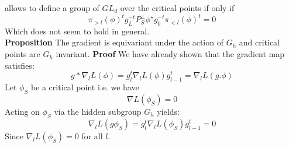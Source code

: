\documentclass{article}
\theoremstyle{definition}
\begin{document}
allows to define a group of $GL_d$ over the critical points if only if 
\begin{equation*}
   \pi_{>l}(\phi)^{t}g_L^{-t}P_S^{\perp}\phi^{\star}g_0^{-t}\pi_{<l}(\phi)^{t} = 0
\end{equation*}
Which does not seem to hold in general.
\\
\textbf{Proposition} The gradient is equivariant under the action of $G_h$ and critical points are $G_h$ invariant.
\textbf{Proof} We have already shown that the gradient map satisfies:
\begin{equation*}
    g \ast \nabla_l L(\phi) = g_l^t\nabla_l L(\phi) g_{l-1}^t = \nabla_l L(g.\phi)
\end{equation*}
Let $\phi_S$ be a critical point i.e. we have 
\begin{equation*}
    \nabla L(\phi_S) = 0
\end{equation*}
Acting on $\phi_S$ via the hidden subgroup $G_h$ yields:
\begin{equation*}
    \nabla_l L(g\phi_S) = g_l^t\nabla_l L(\phi_S) g_{l-1}^t = 0
\end{equation*}
Since $\nabla_l L(\phi_S) = 0$ for all $l$.
\end{document}
